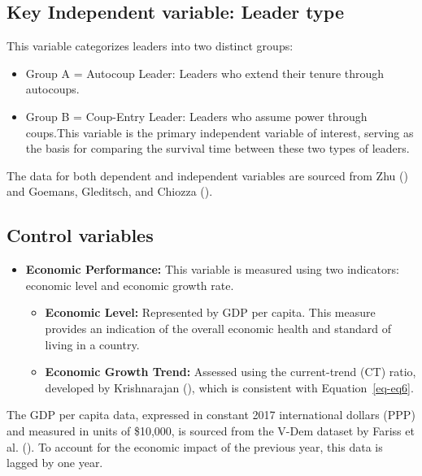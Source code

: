 \documentclass[
  12pt,
]{report}
\providecommand{\tightlist}{%
  \setlength{\itemsep}{0pt}\setlength{\parskip}{0pt}}\usepackage{longtable,booktabs,array}
\begin{document}
\subsection{Key Independent variable: Leader
type}\label{key-independent-variable-leader-type}

This variable categorizes leaders into two distinct groups:

\begin{itemize}
\tightlist
\item
  Group A = Autocoup Leader: Leaders who extend their tenure through
  autocoups.
\item
  Group B = Coup-Entry Leader: Leaders who assume power through
  coups.This variable is the primary independent variable of interest,
  serving as the basis for comparing the survival time between these two
  types of leaders.
\end{itemize}

The data for both dependent and independent variables are sourced from
Zhu () and Goemans, Gleditsch, and Chiozza
().

\subsection{Control variables}\label{control-variables}

\begin{itemize}
\item
  \textbf{Economic Performance:} This variable is measured using two
  indicators: economic level and economic growth rate.

  \begin{itemize}
  \item
    \textbf{Economic Level:} Represented by GDP per capita. This measure
    provides an indication of the overall economic health and standard
    of living in a country.
  \item
    \textbf{Economic Growth Trend:} Assessed using the current-trend
    (CT) ratio, developed by Krishnarajan
    (), which is consistent with
    Equation~\ref{eq-eq6}.
  \end{itemize}
\end{itemize}

The GDP per capita data, expressed in constant 2017 international
dollars (PPP) and measured in units of \$10,000, is sourced from the
V-Dem dataset by Fariss et al. (). To
account for the economic impact of the previous year, this data is
lagged by one year.
\end{document}
